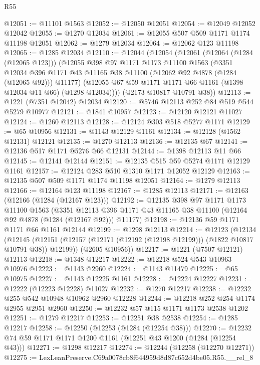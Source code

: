 \begin{lexlean}{R55}
\begin{coremodule}
@12051 := @11101 @1563
@12052 := @12050 @12051
@12054 := @12049 @12052 @12042
@12055 := @1270 @12034
@12061 := @12055 @507 @509 @1171 @1174 @11198 @12051
@12062 := @1279 @12034
@12064 := @12062 @123 @11198
@12065 := @1285 @12034
@12110 := @12044
    (@12054
      (@12061
        (@12064 (@1284 (@12065 @123)))
        (@12055
          @398
          @97
          @1171
          @1173
          @11100
          @1563
          (@3351
            @12034
            @396
            @1171
            @43
            @11165
            @38
            @11100
            (@12062 @92 @4878 (@1284 (@12065 @92)))
            @11177)
          (@12055 @67 @59 @1171 @1171 @66 @1161 (@1398 @12034 @11 @66) (@1298 @12034))))
      (@2173 @10817 @10791 @38))
@12113 := @1221 (@7351 @12042) @12034
@12120 := @5746 @12113 @252 @84 @519 @544 @5279 @10977
@12121 := @1841 @10957
@12123 := @12120 @12121 @11027
@12124 := @1260 @12113
@12128 := @12124 @303 @518 @5277 @1171
@12129 := @65 @10956
@12131 := @1143 @12129 @1161
@12134 := @12128 (@1562 @12131) @12121
@12135 := @1270 @12113
@12136 := @12135 @67
@12141 := @12136 @517 @1171 @5276 @66 @12131
@12144 := @1398 @12113 @11 @66
@12145 := @12141 @12144
@12151 := @12135 @515 @59 @5274 @1171 @12129 @1161
@12157 := @12124 @283 @510 @1310 @1171 @12052 @12129
@12163 := @12135 @507 @509 @1171 @1174 @11198 @12051
@12164 := @1279 @12113
@12166 := @12164 @123 @11198
@12167 := @1285 @12113
@12171 := @12163 (@12166 (@1284 (@12167 @123)))
@12192 := @12135
    @398
    @97
    @1171
    @1173
    @11100
    @1563
    (@3351 @12113 @396 @1171 @43 @11165 @38 @11100 (@12164 @92 @4878 (@1284 (@12167 @92))) @11177)
@12198 := @12136 @59 @1171 @1171 @66 @1161 @12144
@12199 := @1298 @12113
@12214 := @12123
    (@12134
      (@12145 (@12151 (@12157 (@12171 (@12192 (@12198 @12199))) (@1822 @10817 @10791 @38)) @12199))
      (@2605 @10956))
@12217 := @1221 (@7507 @12121) @12113
@12218 := @1348 @12217
@12222 := @12218 @524 @543 @10963 @10976
@12223 := @1143 @2960
@12224 := @1143 @11479
@12225 := @65 @10975
@12227 := @1143 @12225 @1161
@12228 := @12224 @12227
@12231 := @12222 (@12223 @12228) @11027
@12232 := @1270 @12217
@12238 := @12232 @255 @542 @10948 @10962 @2960 @12228
@12244 := @12218 @252 @254 @1174 @2955 @2951 @2960
@12250 := @12232 @57 @115 @1171 @1173 @2538 @1202
@12251 := @1279 @12217
@12253 := @12251 @38 @2538
@12254 := @1285 @12217
@12258 := @12250 (@12253 (@1284 (@12254 @38)))
@12270 := @12232 @74 @59 @1171 @1171 @1200 @1161 (@12251 @43 @1200 (@1284 (@12254 @43)))
@12271 := @1298 @12217
@12274 := @12244 (@12258 (@12270 @12271))
@12275 := LexLeanPreserve.C69a0078cb8f644959d8d87c652d4be05.R55.__rel_8

\end{coremodule}
\end{lexlean}
